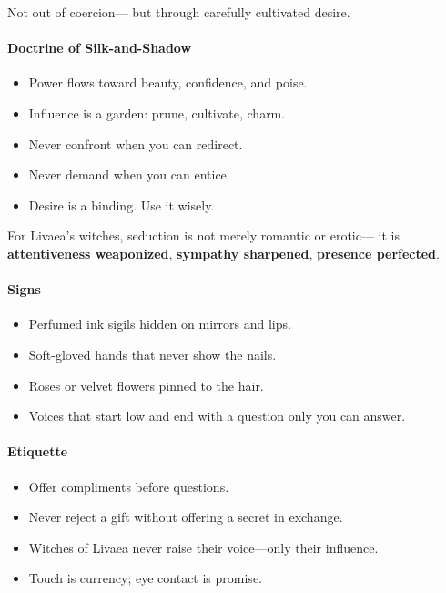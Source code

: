 \documentclass[11pt]{book}
\begin{document}
Not out of coercion---  
but through carefully cultivated desire.

\paragraph{Doctrine of Silk-and-Shadow}
\begin{itemize}[leftmargin=*]
    \item Power flows toward beauty, confidence, and poise.
    \item Influence is a garden: prune, cultivate, charm.
    \item Never confront when you can redirect.
    \item Never demand when you can entice.
    \item Desire is a binding. Use it wisely.
\end{itemize}

For Livaea's witches, seduction is not merely romantic or erotic---
it is \textbf{attentiveness weaponized},  
\textbf{sympathy sharpened},  
\textbf{presence perfected}.

\paragraph{Signs}
\begin{itemize}[leftmargin=*]
    \item Perfumed ink sigils hidden on mirrors and lips.
    \item Soft-gloved hands that never show the nails.
    \item Roses or velvet flowers pinned to the hair.
    \item Voices that start low and end with a question only you can answer.
\end{itemize}

\paragraph{Etiquette}
\begin{itemize}[leftmargin=*]
    \item Offer compliments before questions.
    \item Never reject a gift without offering a secret in exchange.
    \item Witches of Livaea never raise their voice---only their influence.
    \item Touch is currency; eye contact is promise.
\end{itemize}
\end{document}
